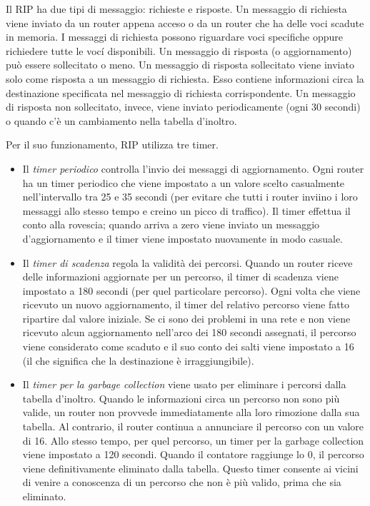 Il RIP ha due tipi di messaggio: richieste e risposte. Un messaggio di richiesta viene inviato da un router appena acceso o da un router che ha delle voci scadute in memoria. I messaggi di richiesta possono riguardare voci specifiche oppure richiedere tutte le vocí disponibili. Un messaggio di risposta (o aggiornamento) può essere sollecitato o meno. Un messaggio di risposta sollecitato viene inviato solo come risposta a un messaggio di richiesta. Esso contiene informazioni circa la destinazione specificata nel messaggio di richiesta corrispondente. Un messaggio di risposta non sollecitato, invece, viene inviato periodicamente (ogni 30 secondi) o quando c'è un cambiamento nella tabella d'inoltro.

Per il suo funzionamento, RIP utilizza tre timer.
\begin{itemize}
    \item Il \textit{timer periodico} controlla l'invio dei messaggi di aggiornamento. Ogni router ha un timer periodico che viene impostato a un valore scelto casualmente nell'intervallo tra 25 e 35 secondi (per evitare che tutti i router inviino i loro messaggi allo stesso tempo e creino un picco di traffico). Il timer effettua il conto alla rovescia; quando arriva a zero viene inviato un messaggio d'aggiornamento e il timer viene impostato nuovamente in modo casuale. 
    \item Il \textit{timer di scadenza} regola la validità dei percorsi. Quando un router riceve delle informazioni aggiornate per un percorso, il timer di scadenza viene impostato a 180 secondi (per quel particolare percorso). Ogni volta che viene ricevuto un nuovo aggiornamento, il timer del relativo percorso viene fatto ripartire dal valore iniziale. Se ci sono dei problemi in una rete e non viene ricevuto alcun aggiornamento nell'arco dei 180 secondi assegnati, il percorso viene considerato come scaduto e il suo conto dei salti viene impostato a 16 (il che significa che la destinazione è irraggiungibile). 
    \item Il \textit{timer per la garbage collection} viene usato per eliminare i percorsi dalla tabella d'inoltro. Quando le informazioni circa un percorso non sono più valide, un router non provvede immediatamente alla loro rimozione dalla sua tabella. Al contrario, il router continua a annunciare il percorso con un valore di 16. Allo stesso tempo, per quel percorso, un timer per la garbage collection viene impostato a 120 secondi. Quando il contatore raggiunge lo 0, il percorso viene definitivamente eliminato dalla tabella. Questo timer consente ai vicini di venire a conoscenza di un percorso che non è più valido, prima che sia eliminato.
\end{itemize}

